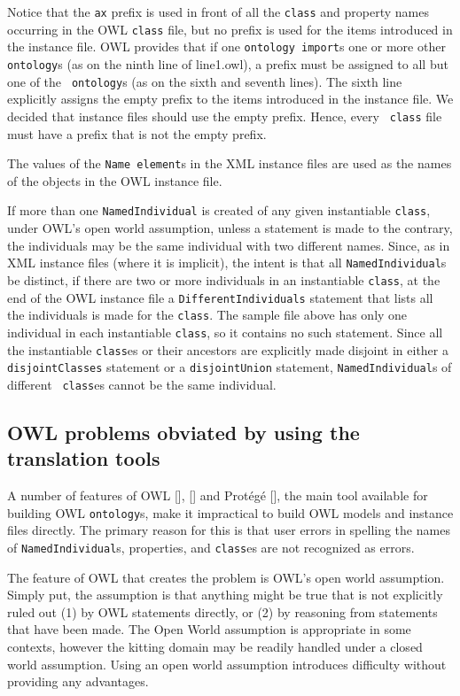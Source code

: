 \documentclass[preprint,12pt]{elsarticle}
\begin{document}
Notice that the {\tt ax} prefix is used in front of all the {\tt class} and
property names occurring in the OWL {\tt class} file, but no prefix is used
for the items introduced in the instance file. OWL provides that if one
{\tt ontology import}s one or more other {\tt ontology}s (as on the ninth
line of line1.owl), a prefix must be assigned to all but one of the {\tt
  ontology}s (as on the sixth and seventh lines). The sixth line explicitly
assigns the empty prefix to the items introduced in the instance file. We
decided that instance files should use the empty prefix. Hence, every {\tt
  class} file must have a prefix that is not the empty prefix.

The values of the {\tt Name element}s in the XML instance files are used as
the names of the objects in the OWL instance file.

If more than one {\tt NamedIndividual} is created of any given instantiable
{\tt class}, under OWL's open world assumption, unless a statement is made
to the contrary, the individuals may be the same individual with two
different names. Since, as in XML instance files (where it is implicit),
the intent is that all {\tt NamedIndividual}s be distinct, if there are two
or more individuals in an instantiable {\tt class}, at the end of the OWL
instance file a {\tt DifferentIndividuals} statement that lists all the
individuals is made for the {\tt class}. The sample file above has only one
individual in each instantiable {\tt class}, so it contains no such
statement. Since all the instantiable {\tt class}es or their ancestors are
explicitly made disjoint in either a {\tt disjointClasses} statement or a
{\tt disjointUnion} statement, {\tt NamedIndividual}s of different {\tt
  class}es cannot be the same individual.

\subsection{OWL problems obviated by using the translation tools}
\label{problemsGone}

A number of features of OWL [],
[] and Prot\'eg\'e [], the main
tool available for building OWL {\tt ontology}s, make it impractical to
build OWL models and instance files directly. The primary reason for this
is that user errors in spelling the names of {\tt NamedIndividual}s,
properties, and {\tt class}es are not recognized as errors.

The feature of OWL that creates the problem is OWL's open world assumption.
Simply put, the assumption is that anything might be true that is not
explicitly ruled out (1) by OWL statements directly, or (2) by reasoning
from statements that have been made. The Open World assumption is
appropriate in some contexts, however the kitting domain may be readily
handled under a closed world assumption. Using an open world assumption
introduces difficulty without providing any advantages.
\end{document}
